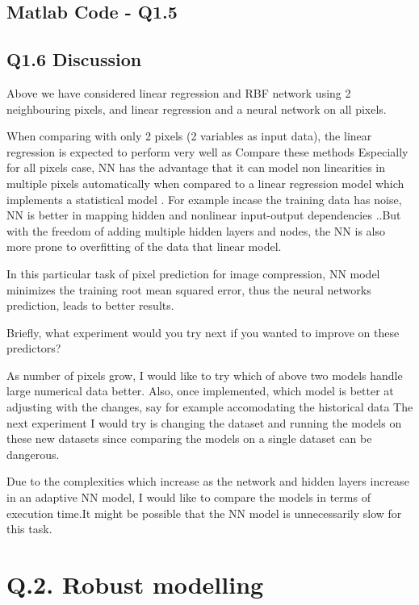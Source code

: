 \documentclass[english]{article}
\begin{document}
\subsection*{Matlab Code - Q1.5}



\subsection*{Q1.6 Discussion}


Above we have considered linear regression and RBF network using 2 neighbouring
pixels, and linear regression and a neural network on all pixels. 

When comparing with only 2 pixels (2 variables as input data), the linear regression is expected to perform very well as 
Compare these methods
Especially for all pixels case, NN has the advantage that it can model non linearities in 
multiple pixels automatically when compared to a linear regression model which implements
a statistical model . For example incase the training data has noise, NN is better in mapping
 hidden and nonlinear input-output dependencies ..But with the freedom of adding multiple hidden layers and nodes, the NN is also more prone to overfitting of the data that linear model. 

In this particular task of pixel prediction for image compression, NN model minimizes the training 
root mean squared error, thus the neural networks prediction, leads to better results.

Briefly, what experiment would you try next if you wanted to improve on these
predictors?

As number of pixels grow, I would like to try which of above two models handle
large numerical data better.
Also, once implemented, which model is better at adjusting with the changes, say 
for example accomodating the historical data 
The next experiment I would try is changing the dataset and running the models on these
new datasets since comparing the models on a single dataset can be dangerous.

Due to the complexities which increase as the network and hidden layers increase in
an adaptive NN model, I would like to compare the models in terms of execution time.It might
be possible that the NN model is unnecessarily slow for this task.

\section*{Q.2. Robust modelling}
\end{document}
